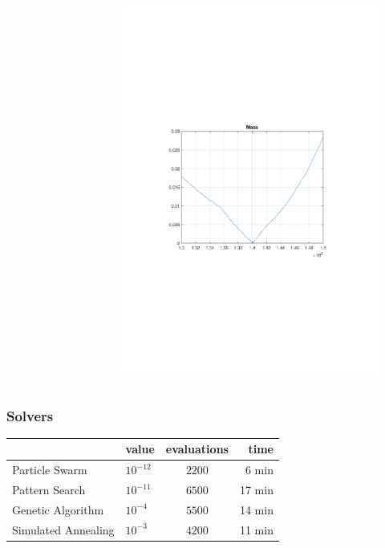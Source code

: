 \begin{frame}[c]
\begin{columns}[c]
\begin{figure}
			\end{figure}
			\vspace{-0.6cm}
			\begin{figure}
				\centering
				\includegraphics[trim=4cm 9cm 4cm 9.5cm, clip=true, width=\linewidth]{img/mass}
			\end{figure}
	\end{columns}
\end{frame}

\begin{frame}[c]
	\frametitle{Solvers}
	\begin{tabular}{l|lcr}
		                    & value      & evaluations & time   \\
		\hline
		Particle Swarm      & $10^{-12}$ & $2200$      & 6 min  \\
		Pattern Search      & $10^{-11}$ & $6500$      & 17 min \\
		Genetic Algorithm   & $10^{-4}$  & $5500$      & 14 min \\
		Simulated Annealing & $10^{-3}$  & $4200$      & 11 min \\
	\end{tabular}
\end{frame}